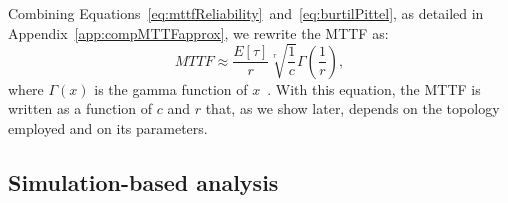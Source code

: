 Combining Equations~\ref{eq:mttfReliability}~and~\ref{eq:burtilPittel}, as detailed in Appendix~\ref{app:compMTTFapprox}, we rewrite the MTTF as:
\begin{equation}
MTTF \approx \frac{E[\tau]}{r}\sqrt[r]{\frac{1}{c}} \Gamma \left (  \frac{1}{r} \right ),
\label{eq:mttfApprox}
\end{equation}
where $\Gamma(x)$ is the gamma function of $x$~\cite{abramowitz1970handbook}. With this equation, the MTTF is written as a function of $c$ and $r$ that, as we show later, depends on the topology employed and on its parameters.

\subsection{Simulation-based analysis}

